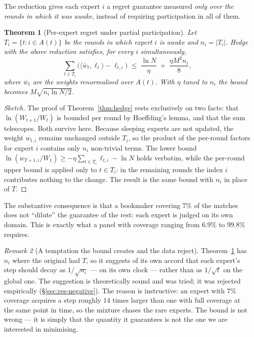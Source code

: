 \documentclass[12pt,a4paper,oneside]{report}
\renewcommand{\_}{\oldunderscore\allowbreak}
\theoremstyle{definition}
\theoremstyle{plain}
\newtheorem{theorem}{Theorem}[chapter]
\theoremstyle{remark}
\newtheorem{remark}[theorem]{Remark}
\begin{document}
The reduction gives each expert $i$ a regret guarantee measured \emph{only over the rounds in
which it was awake}, instead of requiring participation in all of them.

\begin{theorem}[Per-expert regret under partial participation]
\label{thm:sleeping}
Let $T_i = \{t : i \in A(t)\}$ be the rounds in which expert $i$ is awake and $n_i = |T_i|$.
Hedge with the above reduction satisfies, for every $i$ simultaneously,
\[
\sum_{t \in T_i} \Big( \langle \bar{w}_t, \ell_t\rangle - \ell_{t,i} \Big)
\;\leq\; \frac{\ln N}{\eta} \;+\; \frac{\eta M^2 n_i}{8},
\]
where $\bar{w}_t$ are the weights renormalised over $A(t)$. With $\eta$ tuned to $n_i$ the
bound becomes $M\sqrt{n_i \ln N/2}$.
\end{theorem}

\begin{proof}[Sketch]
The proof of Theorem~\ref{thm:hedge} rests exclusively on two facts: that $\ln(W_{t+1}/W_t)$ is
bounded per round by Hoeffding's lemma, and that the sum telescopes. Both survive here. Because
sleeping experts are not updated, the weight $w_{t,i}$ remains unchanged outside $T_i$, so the
product of the per-round factors for expert $i$ contains only $n_i$ non-trivial terms. The
lower bound $\ln(w_{T+1,i}/W_1) \geq -\eta\sum_{t\in T_i}\ell_{t,i} - \ln N$ holds verbatim,
while the per-round upper bound is applied only to $t \in T_i$: in the remaining rounds the
index $i$ contributes nothing to the change. The result is the same bound with $n_i$ in place
of $T$.
\end{proof}

The substantive consequence is that a bookmaker covering $7\%$ of the matches does not
``dilute'' the guarantee of the rest: each expert is judged on its own domain. This is exactly
what a panel with coverage ranging from $6.9\%$ to $99.8\%$ requires.

\begin{remark}[A temptation the bound creates and the data reject]
Theorem~\ref{thm:sleeping} has $n_i$ where the original had $T$, so it suggests of its own
accord that each expert's step should decay as $1/\sqrt{n_i}$ --- on its own clock --- rather
than as $1/\sqrt{t}$ on the global one. The suggestion is theoretically sound and was tried; it
was rejected empirically (\S\ref{sec:res-negative}). The reason is instructive: an expert with
$7\%$ coverage acquires a step roughly $14$ times larger than one with full coverage at the
same point in time, so the mixture chases the rare experts. The bound is not wrong --- it is
simply that the quantity it guarantees is not the one we are interested in minimising.
\end{remark}
\end{document}
